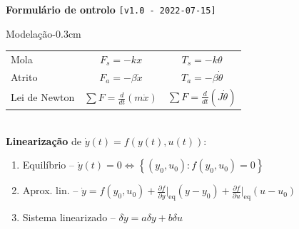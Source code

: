 \documentclass[portuguese,10pt,3col]{cheatsheet}
\begin{document}
{\huge
\begin{center}
    \textbf{Formulário de \textcopyright ontrolo \bishop} \footnotesize \textcolor{bblue}{\texttt{[v1.0 - 2022-07-15]}}
\end{center}
}

\begin{multicols}{3}

\begin{cheatsheetbox}{Modelação}{-0.3cm}
    \begin{tabular}{l c c}
        Mola & $F_s = -kx$ & $T_s = -k\theta$ \\
        Atrito & $F_a = -\beta \dot{x}$ & $T_a = -\beta\dot{\theta}$ \\
        Lei de Newton & $\sum F =\frac{d}{dt}\left(m \dot{x}\right)$ & $\sum F = \frac{d}{dt}(J \dot{\theta})$
    \end{tabular} \\
    
    \textbf{Linearização} de $\dot{y}(t) = f\left(y(t), u(t)\right)$:
    \begin{enumerate}
        \item Equilíbrio -- $\dot{y}(t) = 0 \Leftrightarrow \left\{(y_0, u_0): f(y_0, u_0) = 0\right\}$
        \item Aprox. lin. -- $\dot{y} = f(y_0, u_0) + \frac{\partial f}{\partial y}\big|_\text{eq} (y - y_0) + \frac{\partial f}{\partial u}\big|_\text{eq} (u - u_0)$
        \item Sistema linearizado -- $\boxed{\delta\dot{y} = a\delta y + b \delta u}$
    \end{enumerate}
\end{cheatsheetbox}


\end{multicols}
\end{document}
